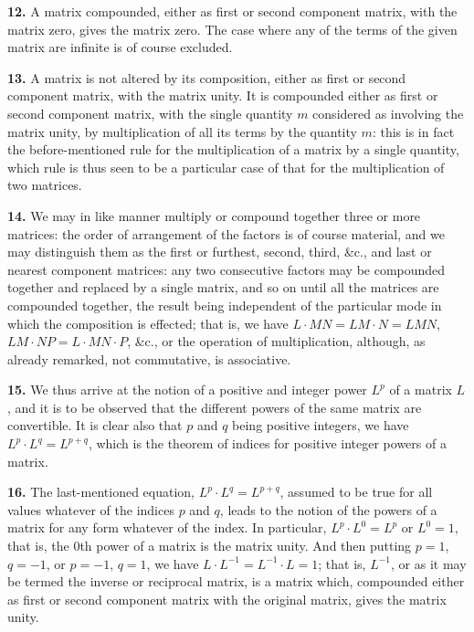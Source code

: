 \documentclass[11pt,a4paper]{book}
\begin{document}
\begin{center}
\medskip
\noindent\textbf{12.} A matrix compounded, either as first or second component matrix, with the matrix zero, gives the matrix zero. The case where any of the terms of the given matrix are infinite is of course excluded.

\medskip
\noindent\textbf{13.} A matrix is not altered by its composition, either as first or second component matrix, with the matrix unity. It is compounded either as first or second component matrix, with the single quantity $m$ considered as involving the matrix unity, by multiplication of all its terms by the quantity $m$: this is in fact the before-mentioned rule for the multiplication of a matrix by a single quantity, which rule is thus seen to be a particular case of that for the multiplication of two matrices.

\medskip
\noindent\textbf{14.} We may in like manner multiply or compound together three or more matrices: the order of arrangement of the factors is of course material, and we may distinguish them as the first or furthest, second, third, \&c., and last or nearest component matrices: any two consecutive factors may be compounded together and replaced by a single matrix, and so on until all the matrices are compounded together, the result being independent of the particular mode in which the composition is effected; that is, we have $L \cdot MN = LM \cdot N = LMN$, $LM \cdot NP = L \cdot MN \cdot P$, \&c., or the operation of multiplication, although, as already remarked, not commutative, is associative.

\medskip
\noindent\textbf{15.} We thus arrive at the notion of a positive and integer power $L^p$ of a matrix $L$, and it is to be observed that the different powers of the same matrix are convertible. It is clear also that $p$ and $q$ being positive integers, we have $L^p \cdot L^q = L^{p+q}$, which is the theorem of indices for positive integer powers of a matrix.

\medskip
\noindent\textbf{16.} The last-mentioned equation, $L^p \cdot L^q = L^{p+q}$, assumed to be true for all values whatever of the indices $p$ and $q$, leads to the notion of the powers of a matrix for any form whatever of the index. In particular, $L^p \cdot L^0 = L^p$ or $L^0 = 1$, that is, the $0$th power of a matrix is the matrix unity. And then putting $p=1$, $q=-1$, or $p=-1$, $q=1$, we have $L \cdot L^{-1} = L^{-1} \cdot L = 1$; that is, $L^{-1}$, or as it may be termed the inverse or reciprocal matrix, is a matrix which, compounded either as first or second component matrix with the original matrix, gives the matrix unity.


\end{center}
\end{document}
